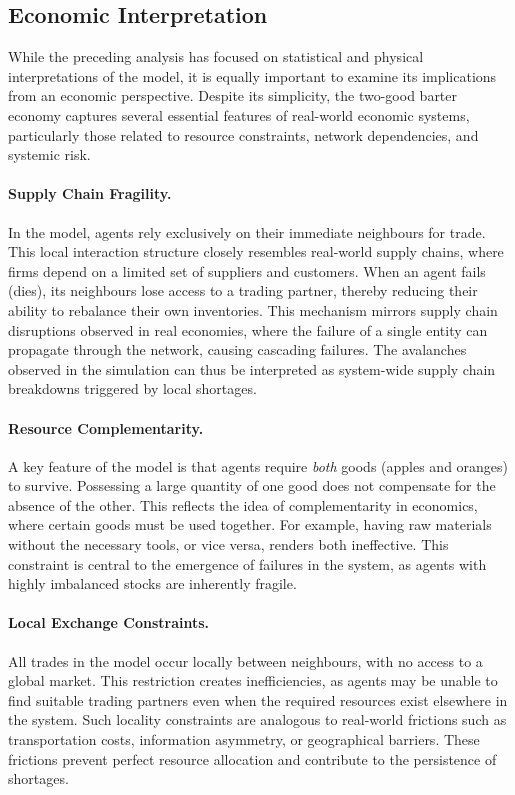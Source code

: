\documentclass[11pt,a4paper]{article}
\begin{document}
\subsection{Economic Interpretation}

While the preceding analysis has focused on statistical and physical
interpretations of the model, it is equally important to examine its
implications from an economic perspective. Despite its simplicity, the
two-good barter economy captures several essential features of real-world
economic systems, particularly those related to resource constraints,
network dependencies, and systemic risk.

\paragraph{Supply Chain Fragility.}
In the model, agents rely exclusively on their immediate neighbours for
trade. This local interaction structure closely resembles real-world
supply chains, where firms depend on a limited set of suppliers and
customers. When an agent fails (dies), its neighbours lose access to a
trading partner, thereby reducing their ability to rebalance their own
inventories. This mechanism mirrors supply chain disruptions observed in
real economies, where the failure of a single entity can propagate
through the network, causing cascading failures. The avalanches observed
in the simulation can thus be interpreted as system-wide supply chain
breakdowns triggered by local shortages.

\paragraph{Resource Complementarity.}
A key feature of the model is that agents require \emph{both} goods
(apples and oranges) to survive. Possessing a large quantity of one good
does not compensate for the absence of the other. This reflects the idea
of complementarity in economics, where certain goods must be used
together. For example, having raw materials without the necessary tools,
or vice versa, renders both ineffective. This constraint is central to
the emergence of failures in the system, as agents with highly imbalanced
stocks are inherently fragile.

\paragraph{Local Exchange Constraints.}
All trades in the model occur locally between neighbours, with no access
to a global market. This restriction creates inefficiencies, as agents
may be unable to find suitable trading partners even when the required
resources exist elsewhere in the system. Such locality constraints are
analogous to real-world frictions such as transportation costs,
information asymmetry, or geographical barriers. These frictions prevent
perfect resource allocation and contribute to the persistence of
shortages.
\end{document}
